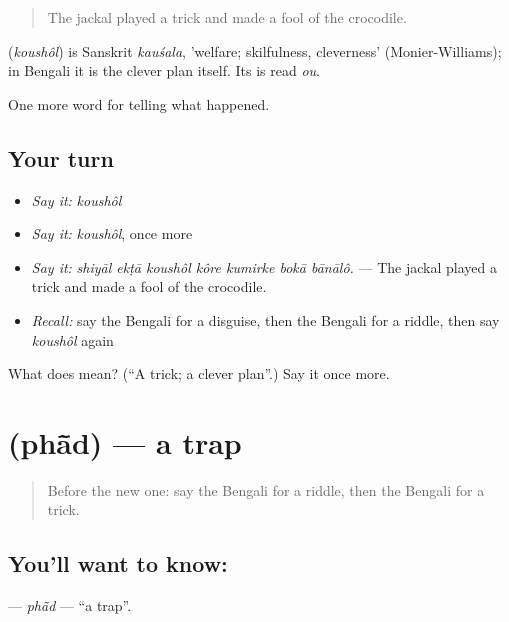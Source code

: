 \begin{quote}
The jackal played a trick and made a fool of the crocodile.
\end{quote}

\begin{cousinweb}
\textbf{} (\emph{koushôl}) is Sanskrit \emph{kauśala}, 'welfare; skilfulness, cleverness' (Monier-Williams); in Bengali it is the clever plan itself. Its  is read \emph{ou}.
\end{cousinweb}

\begin{grammarlens}[title={What you've built}]
One more word for telling what happened.
\end{grammarlens}

\subsection*{Your turn}
\begin{itemize}
\raggedright
  \item \emph{Say it:} \emph{koushôl}
  \item \emph{Say it:} \emph{koushôl}, once more
  \item \emph{Say it:} \emph{shiyāl ekṭā koushôl kôre kumirke bokā bānālô.} — The jackal played a trick and made a fool of the crocodile.
  \item \emph{Recall:} say the Bengali for a disguise, then the Bengali for a riddle, then say \emph{koushôl} again
\end{itemize}

\begin{tcolorbox}[breakable,colback=teal!4,colframe=teal!35!black,title={Before you move on}]
What does  mean? (\textquotedblleft{}A trick; a clever plan\textquotedblright{}.) Say it once more.
\end{tcolorbox}
\section[\texorpdfstring{\bn{ফাঁদ} (phā̃d)}{ফাঁদ (phā̃d)}]{ (phā̃d) — a trap}

\label{lesson:BN-C324-phad}



\begin{quote}
Before the new one: say the Bengali for a riddle, then the Bengali for a trick.
\end{quote}

\subsection*{You'll want to know: }
\textbf{} — \emph{phā̃d} — \textquotedblleft{}a trap\textquotedblright{}.


